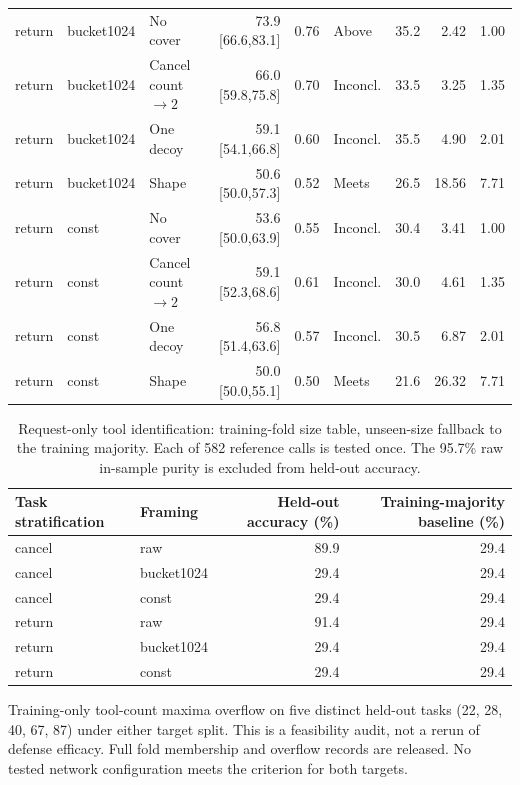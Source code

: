 \begin{table}[!ht]
\begin{tabular}{@{}lllrrlrrr@{}}
return & bucket1024 & No cover & 73.9 [66.6,83.1] & 0.76 & Above & 35.2 & 2.42 & 1.00\\
return & bucket1024 & Cancel count $\to2$ & 66.0 [59.8,75.8] & 0.70 & Inconcl. & 33.5 & 3.25 & 1.35\\
return & bucket1024 & One decoy & 59.1 [54.1,66.8] & 0.60 & Inconcl. & 35.5 & 4.90 & 2.01\\
return & bucket1024 & Shape & 50.6 [50.0,57.3] & 0.52 & Meets & 26.5 & 18.56 & 7.71\\
return & const & No cover & 53.6 [50.0,63.9] & 0.55 & Inconcl. & 30.4 & 3.41 & 1.00\\
return & const & Cancel count $\to2$ & 59.1 [52.3,68.6] & 0.61 & Inconcl. & 30.0 & 4.61 & 1.35\\
return & const & One decoy & 56.8 [51.4,63.6] & 0.57 & Inconcl. & 30.5 & 6.87 & 2.01\\
return & const & Shape & 50.0 [50.0,55.1] & 0.50 & Meets & 21.6 & 26.32 & 7.71\\
\bottomrule\end{tabular}\end{table}

\begin{table}[!ht]\centering\footnotesize
\caption{Request-only tool identification: training-fold size table, unseen-size fallback to the training majority. Each of 582 reference calls is tested once. The 95.7\% raw in-sample purity is excluded from held-out accuracy.}
\begin{tabular}{@{}llrr@{}}\toprule
Task stratification & Framing & Held-out accuracy (\%) & Training-majority baseline (\%)\\\midrule
cancel & raw & 89.9 & 29.4\\
cancel & bucket1024 & 29.4 & 29.4\\
cancel & const & 29.4 & 29.4\\
return & raw & 91.4 & 29.4\\
return & bucket1024 & 29.4 & 29.4\\
return & const & 29.4 & 29.4\\
\bottomrule\end{tabular}
\par\smallskip Training-only tool-count maxima overflow on five distinct held-out tasks (22, 28, 40, 67, 87) under either target split. This is a feasibility audit, not a rerun of defense efficacy. Full fold membership and overflow records are released. No tested network configuration meets the criterion for both targets.
\end{table}
